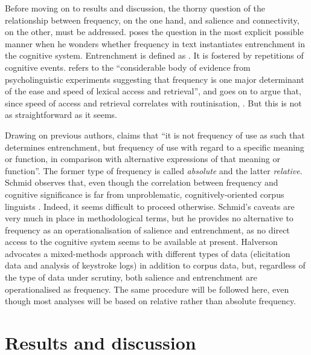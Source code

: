 \documentclass[output=paper,english,spanish,german,english]{langsci/langscibook}
\begin{document}
Before moving on to results and discussion, the thorny question of the relationship between frequency, on the one hand, and salience and connectivity, on the other, must be addressed. \citet{schmid10} poses the question in the most explicit possible manner when he wonders whether frequency in text instantiates entrenchment in the cognitive system. Entrenchment is defined as . It is fostered by repetitions of cognitive events. \citet[116]{schmid10} refers to the \enquote{considerable body of evidence from psycholinguistic experiments suggesting that frequency is one major determinant of the ease and speed of lexical access and retrieval}, and goes on to argue that, since speed of access and retrieval correlates with routinisation, . But this is not as straightforward as it seems.

\largerpage
Drawing on previous authors, \citet[116]{schmid10} claims that \enquote{it is not frequency of use as such that determines entrenchment, but frequency of use with regard to a specific meaning or function, in comparison with alternative expressions of that meaning or function}. The former type of frequency is called \textit{absolute} and the latter \textit{relative}. Schmid observes that, even though the correlation between frequency and cognitive significance is far from unproblematic, cognitively-oriented corpus linguists . Indeed, it seems difficult to proceed otherwise. Schmid’s caveats are very much in place in methodological terms, but he provides no alternative to frequency as an operationalisation of salience and entrenchment, as no direct access to the cognitive system seems to be available at present. Halverson advocates a mixed-methods approach with different types of data (elicitation data and analysis of keystroke logs) in addition to corpus data, but, regardless of the type of data under scrutiny, both salience and entrenchment are operationalised as frequency. The same procedure will be followed here, even though most analyses \parencite[as in][]{halverson17} will be based on relative rather than absolute frequency.

\section{Results and discussion}\label{ana}
\end{document}
